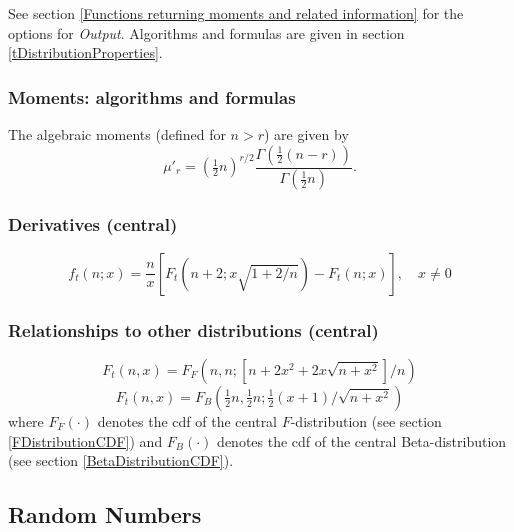 \vspace{0.3cm}

See section \ref{Functions returning moments and related information} for the options for {\itshape\sffamily Output}. Algorithms and formulas are given in section \ref{tDistributionProperties}.



\subsubsection{Moments: algorithms and formulas}

The algebraic moments (defined for $n>r$) are given by
\begin{equation}
	\mu'_r = \left({\tfrac{1}{2}n}\right)^{r/2} \frac{\Gamma\left(\tfrac{1}{2}(n-r)\right)}{\Gamma\left(\tfrac{1}{2}n\right)}.
\end{equation}


\subsubsection{Derivatives (central)}
\begin{equation}
f_t(n;x) = \frac{n}{x}\left[F_t\left(n+2;x\sqrt{1+2/n}\right) -F_t(n;x)\right], \quad x\neq 0
\end{equation}



\subsubsection{Relationships to other distributions (central)}
\begin{equation}
F_t\left(n,x\right) = F_F\left(n, n; \left[n + 2x^2 + 2x\sqrt{n+x^2}\right]/n\right) 
\end{equation}
\begin{equation}
F_t\left(n,x\right) = F_B\left(\tfrac{1}{2}n, \tfrac{1}{2}n; \tfrac{1}{2}(x+1)/\sqrt{n+x^2}\right) 
\end{equation}
where $F_F(\cdot)$ denotes the cdf of the central $F$-distribution (see section \ref{FDistributionCDF}) and $F_B(\cdot)$ denotes the cdf of the central Beta-distribution (see section \ref{BetaDistributionCDF}).



\subsection{Random Numbers}
\label{tDistributionRandom}

